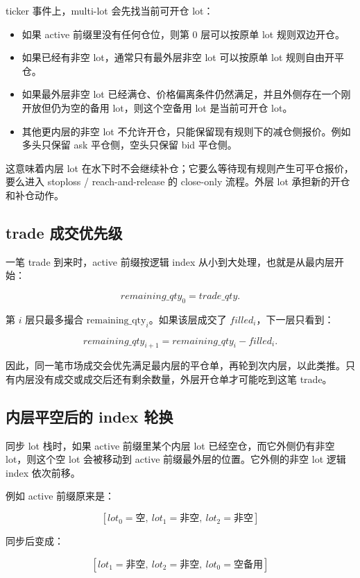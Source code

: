 \documentclass[11pt,a4paper]{ctexart}
\begin{document}
ticker 事件上，multi-lot 会先找当前可开仓 lot：

\begin{itemize}
  \item 如果 active 前缀里没有任何仓位，则第 0 层可以按原单 lot 规则双边开仓。
  \item 如果已经有非空 lot，通常只有最外层非空 lot 可以按原单 lot 规则自由开平仓。
  \item 如果最外层非空 lot 已经满仓、价格偏离条件仍然满足，并且外侧存在一个刚开放但仍为空的备用 lot，则这个空备用 lot 是当前可开仓 lot。
  \item 其他更内层的非空 lot 不允许开仓，只能保留现有规则下的减仓侧报价。例如多头只保留 ask 平仓侧，空头只保留 bid 平仓侧。
\end{itemize}

这意味着内层 lot 在水下时不会继续补仓；它要么等待现有规则产生可平仓报价，要么进入 stoploss / reach-and-release 的 close-only 流程。外层 lot 承担新的开仓和补仓动作。

\subsection{trade 成交优先级}

一笔 trade 到来时，active 前缀按逻辑 index 从小到大处理，也就是从最内层开始：

\[
remaining\_qty_0 = trade\_qty.
\]

第 \(i\) 层只最多撮合 \(\text{remaining\_qty}_i\)。如果该层成交了 \(filled_i\)，下一层只看到：

\[
remaining\_qty_{i+1}=remaining\_qty_i-filled_i.
\]

因此，同一笔市场成交会优先满足最内层的平仓单，再轮到次内层，以此类推。只有内层没有成交或成交后还有剩余数量，外层开仓单才可能吃到这笔 trade。

\subsection{内层平空后的 index 轮换}

同步 lot 栈时，如果 active 前缀里某个内层 lot 已经空仓，而它外侧仍有非空 lot，则这个空 lot 会被移动到 active 前缀最外层的位置。它外侧的非空 lot 逻辑 index 依次前移。

例如 active 前缀原来是：

\[
[lot_0=\text{空},\ lot_1=\text{非空},\ lot_2=\text{非空}]
\]

同步后变成：

\[
[lot_1=\text{非空},\ lot_2=\text{非空},\ lot_0=\text{空备用}]
\]
\end{document}
